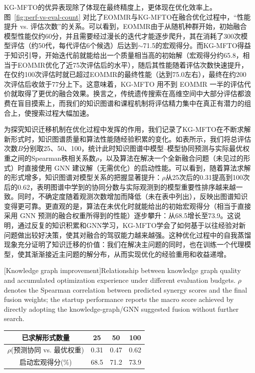 \documentclass[../main.tex]{subfiles}
\begin{document}
KG-MFTO的优异表现除了体现在最终精度上，更体现在优化效率上。图~\ref{fig:perf-vs-eval-count} 对比了EOMMR与KG-MFTO在融合优化过程中，“性能提升 vs. 评估次数”的关系。可以看到，EOMMR由于从随机种群开始，初始融合模型性能仅约60分，并且需要经过漫长的迭代才能逐步爬升，其在消耗了300次模型评估（约50代，每代评估6个候选）后达到$\sim$71.5的宏观得分。而KG-MFTO得益于知识引导，开始迭代前就能给出一个质量相当高的初始解（宏观得分约65.8，相当于EOMMR优化了近75次评估后的水平），随后其性能随着评估次数快速提升，在仅约100次评估时就已超过EOMMR的最终性能（达到75.0左右），最终在约200次评估后收敛于77分上下。这意味着，KG-MFTO 用不到 EOMMR 一半的评估代价就取得了更优的融合效果。换言之，传统遗传搜索在高维空间中大部分评估都浪费在盲目摸索上，而我们的知识图谱和课程机制将评估精力集中在真正有潜力的组合上，使搜索过程大幅加速。

\label{sec:ch5-6-3-ablation-study}

为探究知识迁移机制在优化过程中发挥的作用，我们记录了KG-MFTO在不断求解新形式时，知识图谱质量和算法性能随经验积累的变化。如表所示，我们将总评估次数$B$分别取25、50、100，统计此时知识图谱中模型--模型协同预测与实际最优权重之间的Spearman秩相关系数$\rho$，以及算法在解决一个全新融合问题（未见过的形式）时直接使用 GNN 建议解（无需优化）的启动性能。可以看到，随着算法求解的形式增多，知识图谱对模型关系的把握显著提升：$\rho$从25次后的0.31提高到100次后的0.62，表明图谱中学到的协同分数与实际观测到的模型重要性排序越来越一致。同时，不确定度随着观测次数增加而降低（未在表中列出），反映出图谱知识变得更可靠。更直观的是，算法在未优化时就能给出的初始宏观得分（相当于直接采用 GNN 预测的融合权重所得到的性能）逐步攀升：从68.5增长至73.9。这说明，通过反复的知识积累和GNN学习，KG-MFTO学会了如何基于以往经验对新问题做出较好决策，使其对融合的驾驭能力越来越强。这种优化过程中的自我蒸馏现象充分证明了知识迁移的价值：我们在解决主问题的同时，也在训练一个代理模型，使其渐渐接近主问题的解分布，从而实现优化的经验重用和收益递增。

\begin{table}[tb]
	\centering
	[Knowledge graph improvement]{Relationship between knowledge graph quality and accumulated optimization experience under different evaluation budgets. $\rho$ denotes the Spearman correlation between predicted synergy scores and the final fusion weights; the startup performance reports the macro score achieved by directly adopting the knowledge-graph/GNN suggested fusion without further search.}
	\label{tab:kg-quality}
	\small\begin{tabular}{cccc}
		\toprule
		\textbf{已求解形式数量}      & 25   & 50   & 100  \\
		\midrule
		$\rho$(预测协同 vs. 最优权重) & 0.31 & 0.47 & 0.62 \\
		启动宏观得分(\%)            & 68.5 & 71.2 & 73.9 \\
		\bottomrule
	\end{tabular}
\end{table}
\end{document}
